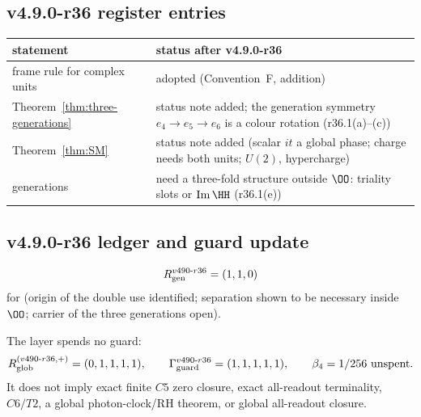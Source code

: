 \subsection*{v4.9.0-r36 register entries}
\label{subsec:v490-r36-register}

\begin{center}
\small
\begin{tabular}{@{}>{\raggedright\arraybackslash}p{}>{\raggedright\arraybackslash}p{}@{}}
\toprule
statement & status after v4.9.0-r36\\
\midrule
frame rule for complex units & adopted (Convention~F, addition)\\
Theorem~\ref{thm:three-generations} & status note added; the generation symmetry \(e_4\to e_5\to e_6\) is a colour rotation (r36.1(a)--(c))\\
Theorem~\ref{thm:SM} & status note added (scalar \(it\) a global phase; charge needs both units; \(U(2)\), hypercharge)\\
generations & need a three-fold structure outside \(\OO\): triality slots or \(\operatorname{Im}\HH\) (r36.1(e))\\
\bottomrule
\end{tabular}
\end{center}

\subsection*{v4.9.0-r36 ledger and guard update}
\label{subsec:v490-r36-ledger-guard}

\[
R_{\rm gen}^{v490\text{-}r36}=(1,1,0)
\]
for (origin of the double use identified; separation shown to be necessary inside \(\OO\); carrier of the three generations open).

The layer spends no guard:
\[
R_{\rm glob}^{(v490\text{-}r36,+)}=(0,1,1,1,1),
\qquad
\Gamma_{\rm guard}^{v490\text{-}r36}=(1,1,1,1,1),
\qquad
\beta_4=1/256\ \text{unspent}.
\]
It does not imply exact finite \(C5\) zero closure, exact all-readout terminality,
\(C6/T2\), a global photon-clock/RH theorem, or global all-readout closure.
